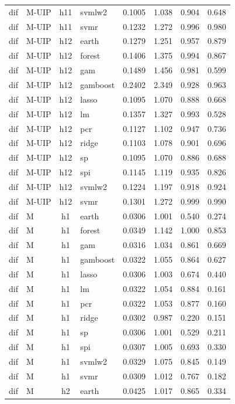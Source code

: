 \begin{ThreePartTable}
\begin{longtable}[t]{llclcccc}
dif & M-UIP & h11 & svmlw2 & 0.1005 & 1.038 & 0.904 & 0.648\\
dif & M-UIP & h11 & svmr & 0.1232 & 1.272 & 0.996 & 0.980\\
\addlinespace
dif & M-UIP & h12 & earth & 0.1279 & 1.251 & 0.957 & 0.879\\
dif & M-UIP & h12 & forest & 0.1406 & 1.375 & 0.994 & 0.867\\
dif & M-UIP & h12 & gam & 0.1489 & 1.456 & 0.981 & 0.599\\
dif & M-UIP & h12 & gamboost & 0.2402 & 2.349 & 0.928 & 0.963\\
dif & M-UIP & h12 & lasso & 0.1095 & 1.070 & 0.888 & 0.668\\
dif & M-UIP & h12 & lm & 0.1357 & 1.327 & 0.993 & 0.528\\
dif & M-UIP & h12 & pcr & 0.1127 & 1.102 & 0.947 & 0.736\\
dif & M-UIP & h12 & ridge & 0.1103 & 1.078 & 0.901 & 0.696\\
dif & M-UIP & h12 & sp & 0.1095 & 1.070 & 0.886 & 0.688\\
dif & M-UIP & h12 & spi & 0.1145 & 1.119 & 0.935 & 0.826\\
dif & M-UIP & h12 & svmlw2 & 0.1224 & 1.197 & 0.918 & 0.924\\
dif & M-UIP & h12 & svmr & 0.1301 & 1.272 & 0.999 & 0.990\\
\addlinespace
dif & M & h1 & earth & 0.0306 & 1.001 & 0.540 & 0.274\\
dif & M & h1 & forest & 0.0349 & 1.142 & 1.000 & 0.853\\
dif & M & h1 & gam & 0.0316 & 1.034 & 0.861 & 0.669\\
dif & M & h1 & gamboost & 0.0322 & 1.055 & 0.864 & 0.627\\
dif & M & h1 & lasso & 0.0306 & 1.003 & 0.674 & 0.440\\
dif & M & h1 & lm & 0.0322 & 1.054 & 0.884 & 0.161\\
dif & M & h1 & pcr & 0.0322 & 1.053 & 0.877 & 0.160\\
dif & M & h1 & ridge & 0.0302 & 0.987 & 0.220 & 0.151\\
dif & M & h1 & sp & 0.0306 & 1.001 & 0.529 & 0.211\\
dif & M & h1 & spi & 0.0307 & 1.005 & 0.693 & 0.330\\
dif & M & h1 & svmlw2 & 0.0329 & 1.075 & 0.845 & 0.149\\
dif & M & h1 & svmr & 0.0309 & 1.012 & 0.767 & 0.182\\
\addlinespace
dif & M & h2 & earth & 0.0425 & 1.017 & 0.865 & 0.334\\

\end{longtable}
\end{ThreePartTable}
